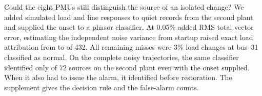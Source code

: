 Could the eight PMUs still distinguish the source of an isolated
change? We added simulated load and line responses to quiet records
from the second plant and supplied the onset to a phasor classifier.
At 0.05\% added RMS total vector error, estimating the independent noise
variance from startup raised exact load attribution from
\ContrastWindowFixed{} to \ContrastWindowLoad{} of 432. All
\ContrastBusMiss{} remaining misses were 3\% load changes at bus~31
classified as normal. On the complete noisy trajectories, the same
classifier identified only \ContrastPAtOnset{} of 72 sources on the
second plant even with the onset supplied. When it also had to issue
the alarm, it identified \ContrastPExact{} before restoration. The
supplement gives the decision rule and the false-alarm counts.
